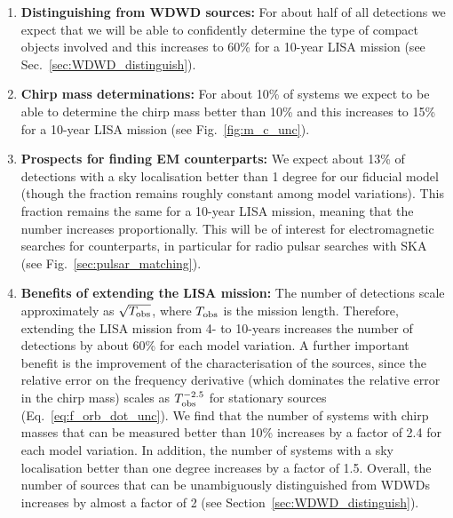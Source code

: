 \begin{enumerate}
    \item \textbf{Distinguishing from WDWD sources:} For about half of all detections we expect that we will be able to confidently determine the type of compact objects involved and this increases to 60\% for a 10-year LISA mission (see Sec.~\ref{sec:WDWD_distinguish}).
    
    \item \textbf{Chirp mass determinations:} For about 10\% of systems we expect to be able to determine the chirp mass better than 10\% and this increases to 15\% for a 10-year LISA mission (see Fig.~\ref{fig:m_c_unc}).

    \item \textbf{Prospects for finding EM counterparts:} We expect about 13\% of detections with a sky localisation better than 1 degree for our fiducial model (though the fraction remains roughly constant among model variations). This fraction remains the same for a 10-year LISA mission, meaning that the number increases proportionally. This will be of interest for electromagnetic searches for counterparts, in particular for radio pulsar searches with SKA (see Fig.~\ref{sec:pulsar_matching}).
 
   \item \textbf{Benefits of extending the LISA mission:} The number of detections scale approximately as $\sqrt{T_{\rm obs}}$, where $T_{\rm obs}$ is the mission length. Therefore, extending the LISA mission from 4- to 10-years increases the number of detections by about 60\% for each model variation. A further important benefit is the improvement of the characterisation of the sources, since the relative error on the frequency derivative (which dominates the relative error in the chirp mass) scales as $T_{\rm obs}^{-2.5}$ for stationary sources (Eq.~\ref{eq:f_orb_dot_unc}). We find that the number of systems with chirp masses that can be measured better than 10\% increases by a factor of 2.4 for each model variation.
   In addition, the number of systems with a sky localisation better than one degree increases by a factor of 1.5. Overall, the number of sources that can be unambiguously distinguished from WDWDs increases by almost a factor of 2 (see Section~\ref{sec:WDWD_distinguish}).
\end{enumerate}